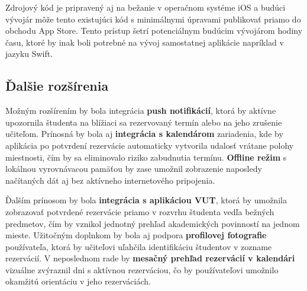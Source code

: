 Zdrojový kód je pripravený aj na bežanie v operačnom systéme iOS a budúci vývojár môže tento existujúci kód s minimálnymi úpravami publikovať priamo do obchodu App Store. Tento prístup šetrí potenciálnym budúcim vývojárom hodiny času, ktoré by inak boli potrebné na vývoj samostatnej aplikácie napríklad v jazyku Swift.

\subsection{Ďalšie rozšírenia}
Možným rozšírením by bola integrácia \textbf{push notifikácií}, ktorá by aktívne upozornila študenta na blížiaci sa rezervovaný termín alebo na jeho zrušenie učiteľom. Prínosná by bola aj \textbf{integrácia s kalendárom} zariadenia, kde by aplikácia po potvrdení rezervácie automaticky vytvorila udalosť vrátane polohy miestnosti, čím by sa eliminovalo riziko zabudnutia termínu. \textbf{Offline režim} s lokálnou vyrovnávacou pamäťou by zase umožnil zobrazenie naposledy načítaných dát aj bez aktívneho internetového pripojenia.

Ďalším prínosom by bola \textbf{integrácia s aplikáciou VUT}, ktorá by umožnila zobrazovať potvrdené rezervácie priamo v rozvrhu študenta vedľa bežných predmetov, čím by vznikol jednotný prehľad akademických povinností na jednom mieste. Užitočným doplnkom by bola aj podpora \textbf{profilovej fotografie} používateľa, ktorá by učiteľovi uľahčila identifikáciu študentov v zozname rezervácií. V neposlednom rade by \textbf{mesačný prehľad rezervácií v kalendári} vizuálne zvýraznil dni s aktívnou rezerváciou, čo by používateľovi umožnilo okamžitú orientáciu v jeho rezerváciách.
